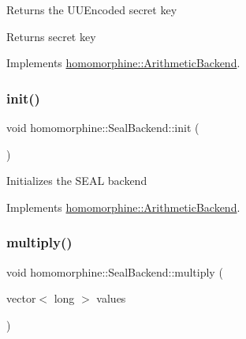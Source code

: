 Returns the U\+U\+Encoded secret key

\begin{DoxyReturn}{Returns}
secret key 
\end{DoxyReturn}


Implements \hyperlink{classhomomorphine_1_1_arithmetic_backend_a679abf60fea83922f7972498c4500252}{homomorphine\+::\+Arithmetic\+Backend}.

\mbox{\label{classhomomorphine_1_1_seal_backend_a106556100ae5f2e9dadfa9fc64603d94}} 
\subsubsection{\texorpdfstring{init()}{init()}}
{\footnotesize\ttfamily void homomorphine\+::\+Seal\+Backend\+::init (\begin{DoxyParamCaption}{ }\end{DoxyParamCaption})\hspace{0.3cm}{\ttfamily [virtual]}}

Initializes the S\+E\+AL backend 

Implements \hyperlink{classhomomorphine_1_1_arithmetic_backend_a2654ee62a6cf2f16fd41c834a26b0006}{homomorphine\+::\+Arithmetic\+Backend}.

\mbox{\label{classhomomorphine_1_1_seal_backend_ace0bb8cd6a0e4b22f6e3e7ab00ea1197}} 
\subsubsection{\texorpdfstring{multiply()}{multiply()}\hspace{0.1cm}{\footnotesize\ttfamily [1/2]}}
{\footnotesize\ttfamily void homomorphine\+::\+Seal\+Backend\+::multiply (\begin{DoxyParamCaption}\item[{vector$<$ long $>$}]{values }\end{DoxyParamCaption})\hspace{0.3cm}{\ttfamily [virtual]}}

